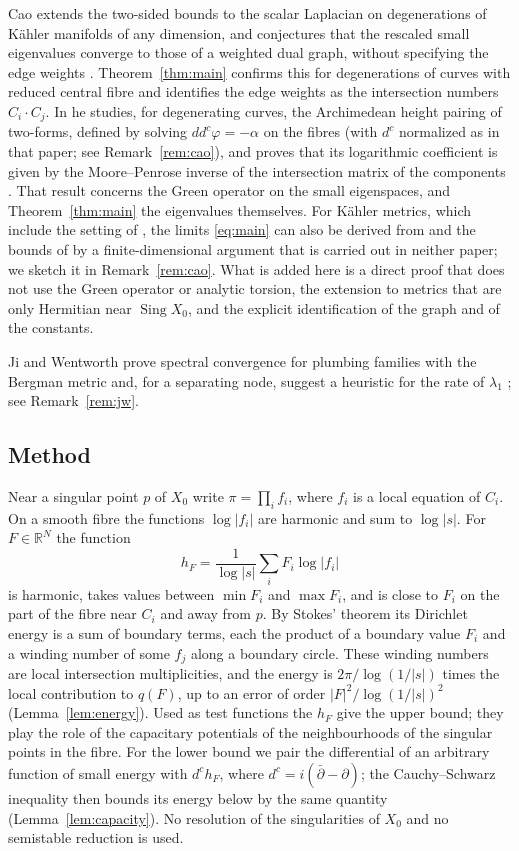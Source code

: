 \documentclass[11pt]{amsart}
\theoremstyle{definition}
\theoremstyle{remark}
\newcommand{\RR}{\mathbb R}
\newcommand{\Sing}{\operatorname{Sing}}
\newcommand{\dc}{d^c}
\begin{document}
Cao \cite{cao-kahler} extends the two-sided bounds to the scalar Laplacian
on degenerations of K\"ahler manifolds of any dimension, and conjectures
that the rescaled small eigenvalues converge to those of a weighted dual
graph, without specifying the edge weights
\cite[Theorem~0.4 and Section~3.C]{cao-kahler}. Theorem~\ref{thm:main}
confirms this for degenerations of curves with reduced central fibre and
identifies the edge weights as the intersection numbers $C_i\cdot C_j$. In \cite{cao-pairing} he
studies, for degenerating curves, the Archimedean height pairing of two-forms, defined by
solving $dd^c\varphi=-\alpha$ on the fibres (with $d^c$ normalized as in
that paper; see Remark~\ref{rem:cao}), and proves that its
logarithmic coefficient is given by the Moore--Penrose inverse of the
intersection matrix of the components
\cite[Theorem~0.2]{cao-pairing}. That result concerns the Green operator on the small eigenspaces, and
Theorem~\ref{thm:main} the eigenvalues themselves. For K\"ahler metrics,
which include the setting of \cite{dai-yoshikawa}, the limits
\eqref{eq:main} can also be derived from \cite{cao-pairing} and the bounds
of \cite{dai-yoshikawa} by a finite-dimensional argument that is carried
out in neither paper; we sketch it in Remark~\ref{rem:cao}. What is added
here is a direct proof that does not use the Green operator or analytic
torsion, the extension to metrics that are only Hermitian near
$\Sing X_0$, and the explicit identification of the graph and of the
constants.

Ji and Wentworth \cite{ji-wentworth} prove spectral convergence for
plumbing families with the Bergman metric and, for a separating node,
suggest a heuristic for the rate of $\lambda_1$
\cite[Remark~5.10]{ji-wentworth}; see Remark~\ref{rem:jw}.

\subsection{Method}
Near a singular point $p$ of $X_0$ write $\pi=\prod_if_i$, where $f_i$ is
a local equation of $C_i$. On a smooth fibre the functions $\log|f_i|$ are
harmonic and sum to $\log|s|$. For $F\in\RR^N$ the function
\[
 h_F=\frac1{\log|s|}\sum_iF_i\log|f_i|
\]
is harmonic, takes values between $\min F_i$ and $\max F_i$, and is close
to $F_i$ on the part of the fibre near $C_i$ and away from $p$. By
Stokes' theorem its Dirichlet energy is a sum of boundary terms, each the
product of a boundary value $F_i$ and a winding number of some $f_j$ along
a boundary circle. These winding numbers are local intersection
multiplicities, and the energy is $2\pi/\log(1/|s|)$ times the local
contribution to $q(F)$, up to an error of order $|F|^2/\log(1/|s|)^2$
(Lemma~\ref{lem:energy}). Used as test functions the $h_F$ give the upper
bound; they play the role of the capacitary potentials of the
neighbourhoods of the singular points in the fibre. For the lower bound we pair the differential of an arbitrary
function of small energy with $\dc h_F$, where $\dc=i(\bar\partial-\partial)$; the Cauchy--Schwarz inequality
then bounds its energy below by the same quantity
(Lemma~\ref{lem:capacity}). No resolution of the singularities of $X_0$
and no semistable reduction is used.
\end{document}
